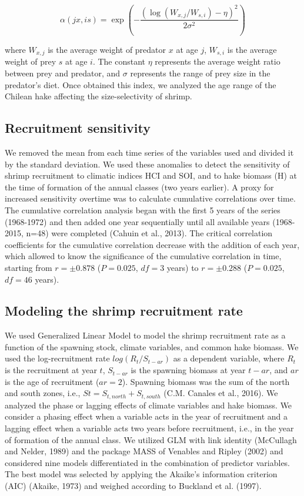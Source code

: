 \documentclass[12pt]{article}
\begin{document}
\[\alpha(jx,is) = \exp \left (   -\frac{ ( \log(W_{x,j}/W_{s,i})-\eta )^2}{2\sigma^2} \right )\]

where \(W_{x,j}\) is the average weight of predator \(x\) at age \(j\),
\(W_{s,i}\) is the average weight of prey \(s\) at age \(i\). The
constant \(\eta\) represents the average weight ratio between prey and
predator, and \(\sigma\) represents the range of prey size in the
predator's diet. Once obtained this index, we analyzed the age range of
the Chilean hake affecting the size-selectivity of shrimp.

\hypertarget{recruitment-sensitivity}{%
\subsection{Recruitment sensitivity}\label{recruitment-sensitivity}}

We removed the mean from each time series of the variables used and
divided it by the standard deviation. We used these anomalies to detect
the sensitivity of shrimp recruitment to climatic indices HCI and SOI,
and to hake biomass (H) at the time of formation of the annual classes
(two years earlier). A proxy for increased sensitivity overtime was to
calculate cumulative correlations over time. The cumulative correlation
analysis began with the first 5 years of the series (1968-1972) and then
added one year sequentially until all available years (1968-2015, n=48)
were completed (Cahuin et al., 2013). The critical correlation
coefficients for the cumulative correlation decrease with the addition
of each year, which allowed to know the significance of the cumulative
correlation in time, starting from \(r = ±0.878\) (\(P = 0.025\),
\(df = 3\) years) to \(r = ±0.288\) (\(P = 0.025\), \(df = 46\) years).

\hypertarget{modeling-the-shrimp-recruitment-rate}{%
\subsection{Modeling the shrimp recruitment
rate}\label{modeling-the-shrimp-recruitment-rate}}

We used Generalized Linear Model to model the shrimp recruitment rate as
a function of the spawning stock, climate variables, and common hake
biomass. We used the log-recruitment rate \(log(R_t/S_{t-ar})\) as a
dependent variable, where \(R_t\) is the recruitment at year \(t\),
\(S_{t-ar}\) is the spawning biomass at year \(t-ar\), and \(ar\) is the
age of recruitment (\(ar = 2\)). Spawning biomass was the sum of the
north and south zones, i.e., \(St = S_{t,north} + S_{t,south}\) (C.M.
Canales et al., 2016). We analyzed the phase or lagging effects of
climate variables and hake biomass. We consider a phasing effect when a
variable acts in the year of recruitment and a lagging effect when a
variable acts two years before recruitment, i.e., in the year of
formation of the annual class. We utilized GLM with link identity
(McCullagh and Nelder, 1989) and the package MASS of Venables and Ripley
(2002) and considered nine models differentiated in the combination of
predictor variables. The best model was selected by applying the
Akaike's information criterion (AIC) (Akaike, 1973) and weighed
according to Buckland et al. (1997).
\end{document}
